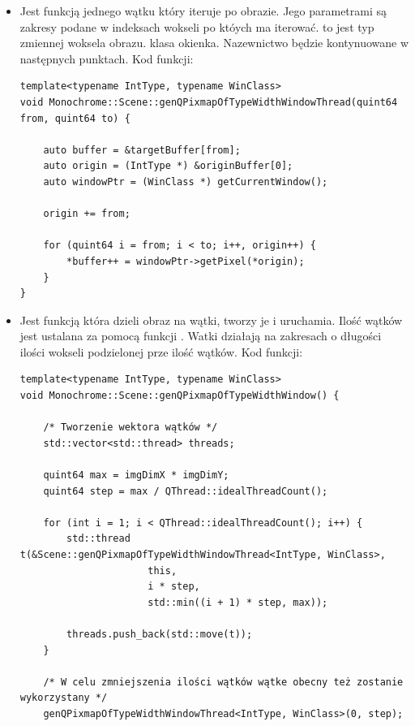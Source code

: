 \begin{itemize}
    \item {}

          Jest funkcją jednego wątku który iteruje po obrazie.
          Jego parametrami są zakresy podane w indeksach wokseli po któych ma iterować.
           to jest typ zmiennej woksela obrazu.
           klasa okienka.
          Nazewnictwo będzie kontynuowane w następnych punktach.
          Kod funkcji:
          \begin{lstlisting}
template<typename IntType, typename WinClass>
void Monochrome::Scene::genQPixmapOfTypeWidthWindowThread(quint64 from, quint64 to) {

	auto buffer = &targetBuffer[from];
	auto origin = (IntType *) &originBuffer[0];
	auto windowPtr = (WinClass *) getCurrentWindow();

	origin += from;

	for (quint64 i = from; i < to; i++, origin++) {
		*buffer++ = windowPtr->getPixel(*origin);
	}
}
\end{lstlisting}

    \item {}

          Jest funkcją która dzieli obraz na wątki, tworzy je i uruchamia.
          Ilość wątków jest ustalana za pomocą funkcji .
          Watki działają na zakresach o długości ilości wokseli podzielonej prze ilość wątków.
          Kod funkcji:
\begin{lstlisting}
template<typename IntType, typename WinClass>
void Monochrome::Scene::genQPixmapOfTypeWidthWindow() {

    /* Tworzenie wektora wątków */
    std::vector<std::thread> threads;

    quint64 max = imgDimX * imgDimY;
    quint64 step = max / QThread::idealThreadCount();

    for (int i = 1; i < QThread::idealThreadCount(); i++) {
        std::thread t(&Scene::genQPixmapOfTypeWidthWindowThread<IntType, WinClass>,
                      this,
                      i * step,
                      std::min((i + 1) * step, max));

        threads.push_back(std::move(t));
    }

    /* W celu zmniejszenia ilości wątków wątke obecny też zostanie wykorzystany */
    genQPixmapOfTypeWidthWindowThread<IntType, WinClass>(0, step);


\end{lstlisting}
\end{itemize}
